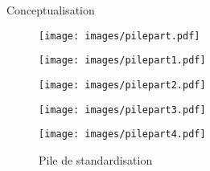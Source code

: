 \begin{frame}{Conceptualisation}
\begin{figure}


	  \begin{overprint}

	 \centerline{\texttt{[image: images/pilepart.pdf]}}
	 \centerline{\texttt{[image: images/pilepart1.pdf]}}
	 \centerline{\texttt{[image: images/pilepart2.pdf]}}
	 \centerline{\texttt{[image: images/pilepart3.pdf]}}
	 \centerline{\texttt{[image: images/pilepart4.pdf]}}

	  \end{overprint}
	  \caption{Pile de standardisation}
	  
\end{figure}
\end{frame}
